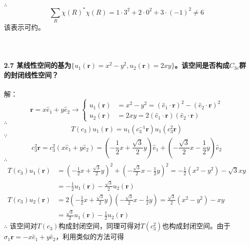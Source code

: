 \documentclass[12pt]{article}
\numberwithin{equation}{section}	 %
\begin{document}
\begin{spacing}{1.5}
$\therefore$
\begin{equation}
\sum_{R}\chi(R)^{*}\chi(R) = 1\cdot3^{2} + 2\cdot0^{2} + 3\cdot(-1)^{2} \ne 6
\end{equation}
该表示可约。\\
~\\
~\\
~\\
\textbf{2.7 \quad 某线性空间的基为$\{u_{1}(\bm{r})=x^{2}-y^{2}, u_{2}(\bm{r})=2xy\}$。该空间是否构成$C_{3v}$群的封闭线性空间？}\\
~\\
解：
\begin{equation}
\bm{r} = x\hat{e}_{1}+y\hat{e}_{2} \longrightarrow \left\{ \begin{aligned}
u_{1}(\bm{r}) &= x^{2}-y^{2} = \left( \hat{e}_{1}\cdot\bm{r} \right)^{2} - \left( \hat{e}_{2}\cdot\bm{r} \right)^{2}\\
u_{2}(\bm{r}) &= 2xy = 2\left( \hat{e}_{1}\cdot\bm{r} \right) \left( \hat{e}_{2}\cdot\bm{r} \right)
\end{aligned} \right.
\end{equation}
$\therefore$
\begin{equation}
T(c_{3})u_{1}(\bm{r}) = u_{1}(c_{3}^{-1}\bm{r}) u_{1}(c_{3}^{2}\bm{r})
\end{equation}
$\because$
\begin{equation}
c_{3}^{2}\bm{r} = c_{3}^{2}\left(x\hat{e}_{1}+y\hat{e}_{2}\right) = \left( -\frac{1}{2}x + \frac{\sqrt{3}}{2}y \right)\hat{e}_{1} + \left( -\frac{\sqrt{3}}{2}x - \frac{1}{2}y\right)\hat{e}_{2}
\end{equation}
$\therefore$
\begin{align*}
T(c_{3})u_{1}(\bm{r}) &= \left( -\frac{1}{2}x + \frac{\sqrt{3}}{2}y \right)^{2} + \left( -\frac{\sqrt{3}}{2}x - \frac{1}{2}y\right)^{2} = -\frac{1}{2}\left(x^{2}-y^{2}\right) - \sqrt{3}xy \\
&= -\frac{1}{2}u_{1}(\bm{r}) - \frac{\sqrt{3}}{2}u_{2}(\bm{r}) \\
T(c_{3})u_{2}(\bm{r}) &= 2 \left( -\frac{1}{2}x + \frac{\sqrt{3}}{2}y \right) \left( -\frac{\sqrt{3}}{2}x - \frac{1}{2}y\right) = \frac{\sqrt{3}}{2}\left(x^{2}-y^{2}\right) - xy \\
&= \frac{\sqrt{3}}{2}u_{1}(\bm{r}) - \frac{1}{2}u_{2}(\bm{r})
\end{align*}
$\therefore$ 该空间对$T(c_{3})$构成封闭空间，同理可得对$T(c_{3}^{2})$也构成封闭空间。由于$\sigma_{1}\bm{r} = -x\hat{e}_{1}+y\hat{e}_{2}$，利用类似的方法可得
\begin{align*}

\end{align*}
\end{spacing}
\end{document}
